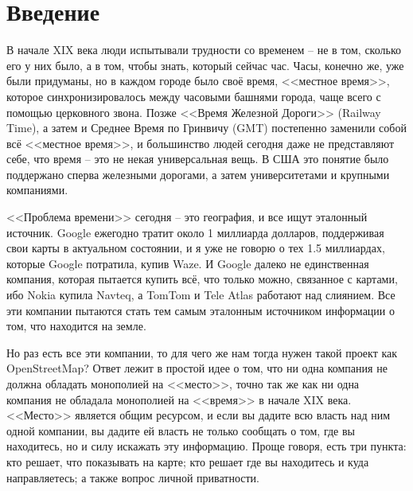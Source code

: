 \chapter{Введение}
В начале XIX века люди испытывали трудности со временем -- не в том, сколько 
его у них было, а в том, чтобы знать, который сейчас час. Часы, конечно же, 
уже были придуманы, но в каждом городе было своё время, <<местное время>>, 
которое синхронизировалось между часовыми башнями города, чаще всего с 
помощью церковного звона. Позже <<Время Железной Дороги>> (Railway Time), а 
затем и Среднее Время по Гринвичу (GMT) постепенно заменили собой всё 
<<местное время>>, и большинство людей сегодня даже не представляют себе, что 
время -- это не некая универсальная вещь. В США это понятие было поддержано 
сперва железными дорогами, а затем университетами и крупными компаниями.

<<Проблема времени>> сегодня -- это география, и все ищут эталонный источник. 
Google ежегодно тратит около 1 миллиарда долларов, поддерживая свои карты в 
актуальном состоянии, и я уже не говорю о тех 1.5 миллиардах, которые Google 
потратила, купив Waze\cite{waze}. И Google далеко не единственная компания, 
которая пытается купить всё, что только можно, связанное с картами, ибо 
Nokia купила Navteq\cite{navteq}, а TomTom\cite{tomtom} и 
Tele Atlas\cite{teleatlas} работают над слиянием. Все эти компании пытаются 
стать тем самым эталонным источником информации о том, что находится на земле.

Но раз есть все эти компании, то для чего же нам тогда нужен такой проект как 
OpenStreetMap? Ответ лежит в простой идее о том, что ни одна компания не 
должна обладать монополией на <<место>>, точно так же как ни одна компания не 
обладала монополией на <<время>> в начале XIX века. <<Место>> является общим 
ресурсом, и если вы дадите всю власть над ним одной компании, вы дадите ей 
власть не только сообщать о том, где вы находитесь, но и силу искажать эту 
информацию. Проще говоря, есть три пункта: кто решает, что показывать на 
карте; кто решает где вы находитесь и куда направляетесь; а также вопрос 
личной приватности.

